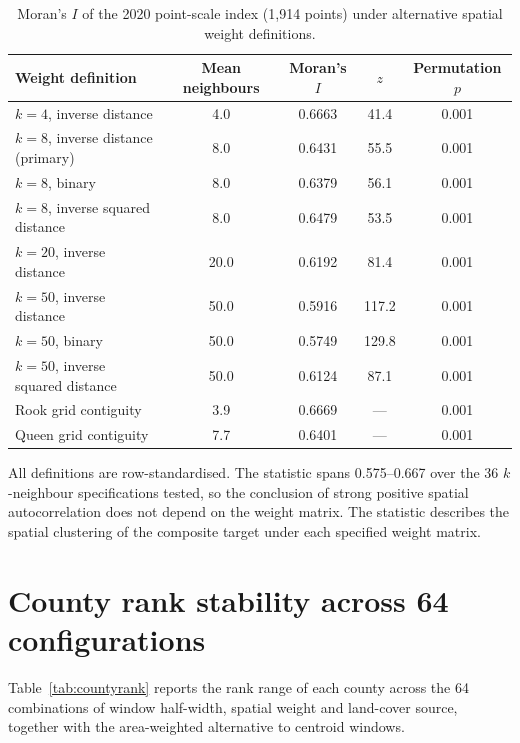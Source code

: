 \documentclass[preprint,11pt,authoryear]{elsarticle}
\begin{document}
\begin{table}[htbp]
\centering
\caption{Moran's $I$ of the 2020 point-scale index (1{,}914 points) under alternative spatial weight definitions.}
\label{tab:moran}
\footnotesize
\setlength{\tabcolsep}{4pt}
\begin{tabular}{lcccc}
\toprule
Weight definition & Mean neighbours & Moran's $I$ & $z$ & Permutation $p$ \\
\midrule
$k=4$, inverse distance & 4.0 & 0.6663 & 41.4 & 0.001 \\
$k=8$, inverse distance (primary) & 8.0 & 0.6431 & 55.5 & 0.001 \\
$k=8$, binary & 8.0 & 0.6379 & 56.1 & 0.001 \\
$k=8$, inverse squared distance & 8.0 & 0.6479 & 53.5 & 0.001 \\
$k=20$, inverse distance & 20.0 & 0.6192 & 81.4 & 0.001 \\
$k=50$, inverse distance & 50.0 & 0.5916 & 117.2 & 0.001 \\
$k=50$, binary & 50.0 & 0.5749 & 129.8 & 0.001 \\
$k=50$, inverse squared distance & 50.0 & 0.6124 & 87.1 & 0.001 \\
Rook grid contiguity & 3.9 & 0.6669 & --- & 0.001 \\
Queen grid contiguity & 7.7 & 0.6401 & --- & 0.001 \\
\bottomrule
\end{tabular}

\vspace{2pt}
{\scriptsize All definitions are row-standardised. The statistic spans 0.575--0.667 over the 36 $k$-neighbour specifications tested, so the conclusion of strong positive spatial autocorrelation does not depend on the weight matrix. The statistic describes the spatial clustering of the composite target under each specified weight matrix.}
\end{table}

\section{County rank stability across 64 configurations}
\label{app:countyrank}
Table~\ref{tab:countyrank} reports the rank range of each county across the 64 combinations of window half-width, spatial weight and land-cover source, together with the area-weighted alternative to centroid windows.
\end{document}
